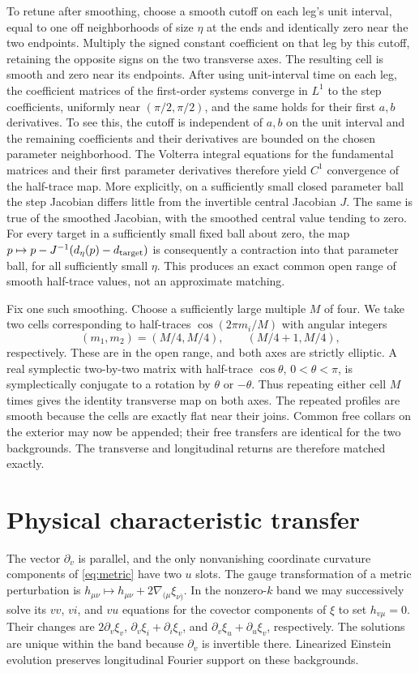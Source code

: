 \documentclass[11pt]{article}
\begin{document}
To retune after smoothing, choose a smooth cutoff on each leg's unit interval, equal to one off neighborhoods of size $\eta$ at the ends and identically zero near the two endpoints. Multiply the signed constant coefficient on that leg by this cutoff, retaining the opposite signs on the two transverse axes. The resulting cell is smooth and zero near its endpoints. After using unit-interval time on each leg, the coefficient matrices of the first-order systems converge in $L^1$ to the step coefficients, uniformly near $(\pi/2,\pi/2)$, and the same holds for their first $a,b$ derivatives. To see this, the cutoff is independent of $a,b$ on the unit interval and the remaining coefficients and their derivatives are bounded on the chosen parameter neighborhood. The Volterra integral equations for the fundamental matrices and their first parameter derivatives therefore yield $C^1$ convergence of the half-trace map. More explicitly, on a sufficiently small closed parameter ball the step Jacobian differs little from the invertible central Jacobian $J$. The same is true of the smoothed Jacobian, with the smoothed central value tending to zero. For every target in a sufficiently small fixed ball about zero, the map $p\mapsto p-J^{-1}(d_\eta(p)-d_{\rm target})$ is consequently a contraction into that parameter ball, for all sufficiently small $\eta$. This produces an exact common open range of smooth half-trace values, not an approximate matching.

Fix one such smoothing. Choose a sufficiently large multiple $M$ of four. We take two cells corresponding to half-traces $\cos(2\pi m_i/M)$ with angular integers
\[
 (m_1,m_2)=(M/4,M/4),\qquad (M/4+1,M/4),
\]
respectively. These are in the open range, and both axes are strictly elliptic. A real symplectic two-by-two matrix with half-trace $\cos\theta$, $0<\theta<\pi$, is symplectically conjugate to a rotation by $\theta$ or $-\theta$. Thus repeating either cell $M$ times gives the identity transverse map on both axes. The repeated profiles are smooth because the cells are exactly flat near their joins. Common free collars on the exterior may now be appended; their free transfers are identical for the two backgrounds. The transverse and longitudinal returns are therefore matched exactly.

\section{Physical characteristic transfer}
The vector $\partial_v$ is parallel, and the only nonvanishing coordinate curvature components of \eqref{eq:metric} have two $u$ slots. The gauge transformation of a metric perturbation is
$h_{\mu\nu}\mapsto h_{\mu\nu}+2\nabla_{(\mu}\xi_{\nu)}$.
In the nonzero-$k$ band we may successively solve its $vv$, $vi$, and $vu$ equations for the covector components of $\xi$ to set $h_{v\mu}=0$. Their changes are $2\partial_v\xi_v$, $\partial_v\xi_i+\partial_i\xi_v$, and $\partial_v\xi_u+\partial_u\xi_v$, respectively. The solutions are unique within the band because $\partial_v$ is invertible there. Linearized Einstein evolution preserves longitudinal Fourier support on these backgrounds.
\end{document}
